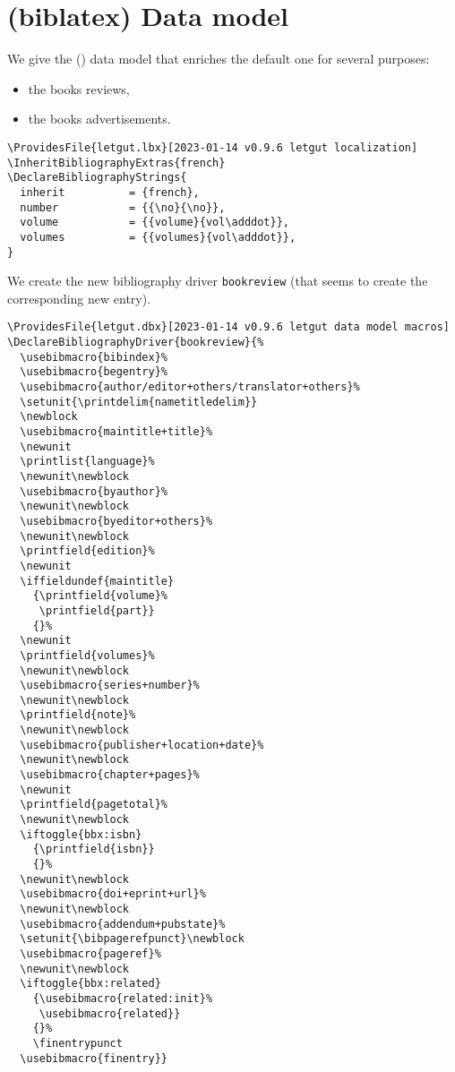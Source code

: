 \documentclass{letgut}
\begin{document}
\section{(biblatex) Data model}
\label{biblatexDatamodel-vx7h55h0jlj0}
We give the () data model that enriches the default one for
several purposes:
\begin{itemize}
\item the books reviews,
\item the books advertisements.
\end{itemize}

\begin{lstlisting}
\ProvidesFile{letgut.lbx}[2023-01-14 v0.9.6 letgut localization]
\InheritBibliographyExtras{french}
\DeclareBibliographyStrings{
  inherit          = {french},
  number           = {{\no}{\no}},
  volume           = {{volume}{vol\adddot}},
  volumes          = {{volumes}{vol\adddot}},
}
\end{lstlisting}

We create the new bibliography driver \lstinline+bookreview+ (that seems to
create the corresponding new entry).

\begin{lstlisting}
\ProvidesFile{letgut.dbx}[2023-01-14 v0.9.6 letgut data model macros]
\DeclareBibliographyDriver{bookreview}{%
  \usebibmacro{bibindex}%
  \usebibmacro{begentry}%
  \usebibmacro{author/editor+others/translator+others}%
  \setunit{\printdelim{nametitledelim}}
  \newblock
  \usebibmacro{maintitle+title}%
  \newunit
  \printlist{language}%
  \newunit\newblock
  \usebibmacro{byauthor}%
  \newunit\newblock
  \usebibmacro{byeditor+others}%
  \newunit\newblock
  \printfield{edition}%
  \newunit
  \iffieldundef{maintitle}
    {\printfield{volume}%
     \printfield{part}}
    {}%
  \newunit
  \printfield{volumes}%
  \newunit\newblock
  \usebibmacro{series+number}%
  \newunit\newblock
  \printfield{note}%
  \newunit\newblock
  \usebibmacro{publisher+location+date}%
  \newunit\newblock
  \usebibmacro{chapter+pages}%
  \newunit
  \printfield{pagetotal}%
  \newunit\newblock
  \iftoggle{bbx:isbn}
    {\printfield{isbn}}
    {}%
  \newunit\newblock
  \usebibmacro{doi+eprint+url}%
  \newunit\newblock
  \usebibmacro{addendum+pubstate}%
  \setunit{\bibpagerefpunct}\newblock
  \usebibmacro{pageref}%
  \newunit\newblock
  \iftoggle{bbx:related}
    {\usebibmacro{related:init}%
     \usebibmacro{related}}
    {}%
    \finentrypunct
  \usebibmacro{finentry}}
\end{lstlisting}
\end{document}
